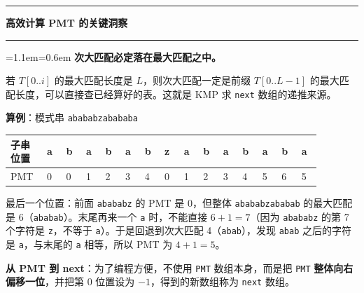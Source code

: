\documentclass[11pt,openany,UTF8]{ctexbook}
\newcommand{\callouthead}[2]{%
  \par\addvspace{7pt}\noindent
  {\color{#1}\rule[-0.15em]{3pt}{1.05em}}\hspace{0.5em}%
  {\bfseries\color{#1}#2}\par\nobreak\vspace{-0.35em}%
  {\color{rulesep}\hrule height 0.4pt}\nobreak\vspace{0.45em}%
  \begingroup\small\setlength{\parindent}{0pt}%
  \leftskip=1.1em\rightskip=0.6em\noindent\ignorespaces}
\newcommand{\calloutend}{\par\endgroup\addvspace{7pt}}
\newenvironment{callkey}[1]{\callouthead{keybar}{#1}}{\calloutend}
\begin{document}
\begin{callkey}{高效计算 PMT 的关键洞察}
\textbf{次大匹配必定落在最大匹配之中。}

若 $T[0..i]$ 的最大匹配长度是 $L$，则次大匹配一定是前缀 $T[0..L-1]$ 的最大匹配长度，可以直接查已经算好的表。这就是 KMP 求 \texttt{next} 数组的递推来源。

\textbf{算例}：模式串 \texttt{abababzabababa}

\begingroup\footnotesize\setlength{\tabcolsep}{1.5pt}
\begin{longtable}{@{}L{0.0589\linewidth}L{0.0589\linewidth}L{0.0589\linewidth}L{0.0589\linewidth}L{0.0589\linewidth}L{0.0589\linewidth}L{0.0589\linewidth}L{0.0589\linewidth}L{0.0589\linewidth}L{0.0589\linewidth}L{0.0589\linewidth}L{0.0589\linewidth}L{0.0589\linewidth}L{0.0589\linewidth}L{0.0589\linewidth}@{}}
\toprule
\textbf{子串位置} & \textbf{a} & \textbf{b} & \textbf{a} & \textbf{b} & \textbf{a} & \textbf{b} & \textbf{z} & \textbf{a} & \textbf{b} & \textbf{a} & \textbf{b} & \textbf{a} & \textbf{b} & \textbf{a} \\
\midrule
\endhead
PMT & 0 & 0 & 1 & 2 & 3 & 4 & 0 & 1 & 2 & 3 & 4 & 5 & 6 & 5 \\
\bottomrule
\end{longtable}
\endgroup

最后一个位置：前面 \texttt{abababz} 的 PMT 是 0，但整体 \texttt{abababzababab} 的最大匹配是 6（\texttt{ababab}）。末尾再来一个 \texttt{a} 时，不能直接 $6+1=7$（因为 \texttt{abababz} 的第 7 个字符是 \texttt{z}，不等于 \texttt{a}）。于是回退到次大匹配 4（\texttt{abab}），发现 \texttt{abab} 之后的字符是 \texttt{a}，与末尾的 \texttt{a} 相等，所以 PMT 为 $4+1=5$。

\end{callkey}

\textbf{从 PMT 到 next}：为了编程方便，不使用 \texttt{PMT} 数组本身，而是把 \texttt{PMT} \textbf{整体向右偏移一位}，并把第 0 位置设为 $-1$，得到的新数组称为 \texttt{next} 数组。
\end{document}
